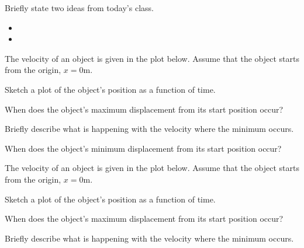 \begin{problem}
\item Briefly state two ideas from today's class.
  \begin{itemize}
  \item
  \item
  \end{itemize}
\item The velocity of an object is given in the plot below. Assume
  that the object starts from the origin, $x=0$m. \\
  \scalebox{0.7}{}
  \begin{subproblem}
  \item Sketch a plot of the object's position as a function of time.
  \item When does the object's maximum displacement from its start
    position occur?
    \vspace{3em}
  \item Briefly describe what is happening with the velocity where the
    minimum occurs.
    \vfill
  \item When does the object's minimum displacement from its start
    position occur?
    \vspace{3em}
  \end{subproblem}

  \clearpage

\item The velocity of an object is given in the plot below. Assume
  that the object starts from the origin, $x=0$m.

  \scalebox{0.7}{}

  \begin{subproblem}
  \item Sketch a plot of the object's position as a function of time.
  \item When does the object's maximum displacement from its start
    position occur?
    \vspace{3em}
  \item Briefly describe what is happening with the velocity where the
    minimum occurs.
    \vfill
  \end{subproblem}

\clearpage


\end{problem}
